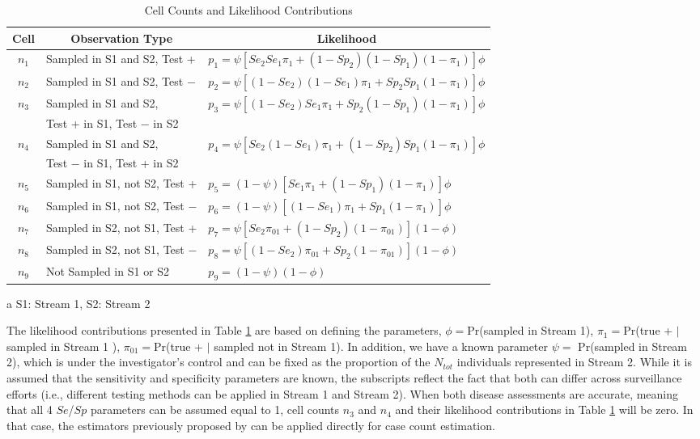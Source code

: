 \documentclass[useAMS,usenatbib,referee]{biom}
\begin{document}
\begin{table}
\centering
\caption{Cell Counts and Likelihood Contributions}
\label{table_1}
\begin{threeparttable}[b]
 \begin{tabular}{cll} 
 \hline
  Cell & \multicolumn{1}{c}{Observation Type\tnote{a}} & \multicolumn{1}{c}{Likelihood} \\ 
 \hline
 $n_1$ & Sampled in S1 and S2, Test +   & $p_1 = \psi[Se_2 Se_1 \pi_{1} + (1-Sp_2)(1-Sp_1) (1-\pi_{1})]\phi$\\ 
 $n_2$ & Sampled in S1 and S2, Test $-$  & $p_2 = \psi[(1-Se_2) (1-Se_1)\pi_{1} + Sp_2 Sp_1 (1-\pi_{1})]\phi$\\
 \multirow{2}{*}{$n_3$} & Sampled in S1 and S2, & \multirow{2}{*}{$p_3 = \psi[(1-Se_2) Se_1\pi_{1} + Sp_2 (1-Sp_1)(1-\pi_{1})]\phi$}\\
  & Test + in S1, Test $-$ in S2  &\\ 
 \multirow{2}{*}{$n_4$} & Sampled in S1 and S2, & \multirow{2}{*}{$p_4 = \psi[Se_2 (1-Se_1)\pi_{1} + (1-Sp_2) Sp_1(1-\pi_{1})]\phi$}\\
  & Test $-$ in S1, Test + in S2  \\ 
 $n_5$ & Sampled in S1, not S2, Test +  & $p_5 = (1-\psi) [Se_1\pi_{1} + (1-Sp_1)(1-\pi_{1})]\phi$\\ 
 $n_6$ & Sampled in S1, not S2, Test $-$  & $p_6 = (1-\psi) [(1-Se_1)\pi_{1} + Sp_1(1-\pi_{1})]\phi$\\
 $n_7$ & Sampled in S2, not S1, Test +  & $p_7 =  \psi[Se_2\pi_{01} + (1-Sp_2)(1-\pi_{01})](1-\phi)$\\ 
 $n_8$ & Sampled in S2, not S1, Test $-$  & $p_8 =  \psi[(1-Se_2)\pi_{01} + Sp_2 (1-\pi_{01})](1-\phi)$\\
 $n_9$ & Not Sampled in S1 or S2  &
 $p_9 = (1-\psi)(1-\phi)$\\
 \hline
 \end{tabular}
 \begin{tablenotes}
        \item[a] \footnotesize S1: Stream 1, S2: Stream 2
  \end{tablenotes}
    \end{threeparttable}
\end{table}

The likelihood contributions presented in Table \ref{table_1} are based on defining the parameters, $\phi=$Pr(sampled in Stream 1), $\pi_{1}=$Pr(true + $|$ sampled in Stream 1 ), $\pi_{01}=$Pr(true + $|$ sampled not in Stream 1). In addition, we have a known parameter $\psi=$ Pr(sampled in Stream 2), which is under the investigator’s control and can be fixed as the proportion of the $N_{tot}$ individuals represented in Stream 2. While it is assumed that the sensitivity and specificity parameters are known, the subscripts reflect the fact that both can differ across surveillance efforts (i.e., different testing methods can be applied in Stream 1 and Stream 2). When both disease assessments are accurate, meaning that all 4 $Se$/$Sp$ parameters can be assumed equal to 1, cell counts $n_3$ and $n_4$ and their likelihood contributions in Table \ref{table_1} will be zero. In that case, the estimators previously proposed by \cite{Lyles2022b} can be applied directly for case count estimation.
\end{document}
